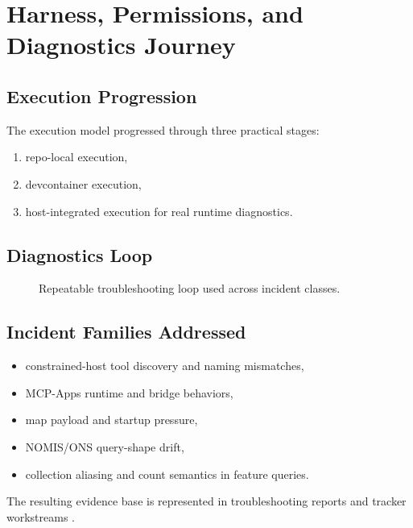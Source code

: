 \chapter{Harness, Permissions, and Diagnostics Journey}
\label{ch:harness}

\section{Execution Progression}

The execution model progressed through three practical stages:
\begin{enumerate}
  \item repo-local execution,
  \item devcontainer execution,
  \item host-integrated execution for real runtime diagnostics.
\end{enumerate}

\section{Diagnostics Loop}

\begin{figure}[h]
\centering
{}
\caption{Repeatable troubleshooting loop used across incident classes.}
\end{figure}

\section{Incident Families Addressed}

\begin{itemize}
  \item constrained-host tool discovery and naming mismatches,
  \item MCP-Apps runtime and bridge behaviors,
  \item map payload and startup pressure,
  \item NOMIS/ONS query-shape drift,
  \item collection aliasing and count semantics in feature queries.
\end{itemize}

The resulting evidence base is represented in troubleshooting reports and tracker
workstreams \cite{troubleshooting_master,peat_failure_chain,nomis_deep_analysis}.
